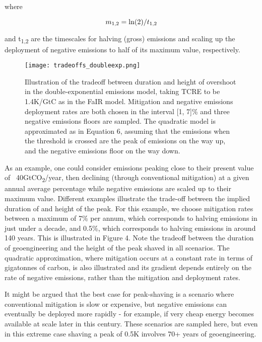 \documentclass[draft]{agujournal2019}
\begin{document}
where

\begin{equation}
m\textsubscript{1,2} = {\ln} (2)/t\textsubscript{1,2} 
\end{equation}


and t\textsubscript{1,2} are the timescales for halving (gross) emissions and scaling up the deployment of negative emissions to half of its maximum value, respectively. 

\begin{figure}[!h]
  \texttt{[image: tradeoffs\_doubleexp.png]}
  \caption{Illustration of the tradeoff between duration and height of overshoot in the double-exponential emissions model, taking TCRE to be 1.4K/GtC as in the FaIR model. Mitigation and negative emissions deployment rates are both chosen in the interval [1, 7]\% and three negative emissions floors are sampled. The quadratic model is approximated as in Equation 6, assuming that the emissions when the threshold is crossed are the peak of emissions on the way up, and the negative emissions floor on the way down.}
  \label{fig:2020vs2040_SRM.png}
\end{figure}


\medskip

As an example, one could consider emissions peaking close to their present value of ~40GtCO\textsubscript{2}/year, then declining (through conventional mitigation) at a given annual average percentage while negative emissions are scaled up to their maximum value. Different examples illustrate the trade-off between the implied duration of and height of the peak. For this example, we choose mitigation rates between a maximum of 7\% per annum, which corresponds to halving emissions in just under a decade, and 0.5\%, which corresponds to halving emissions in around 140 years. This is illustrated in Figure 4. Note the tradeoff between the duration of geoengineering and the height of the peak shaved in all scenarios. The quadratic approximation, where mitigation occurs at a constant rate in terms of gigatonnes of carbon, is also illustrated and its gradient depends entirely on the rate of negative emissions, rather than the mitigation and deployment rates. 

\medskip 

It might be argued that the best case for peak-shaving is a scenario where conventional mitigation is slow or expensive, but negative emissions can eventually be deployed more rapidly - for example, if very cheap energy becomes available at scale later in this century. These scenarios are sampled here, but even in this extreme case shaving a peak of 0.5K involves 70+ years of geoengineering. 
\end{document}
